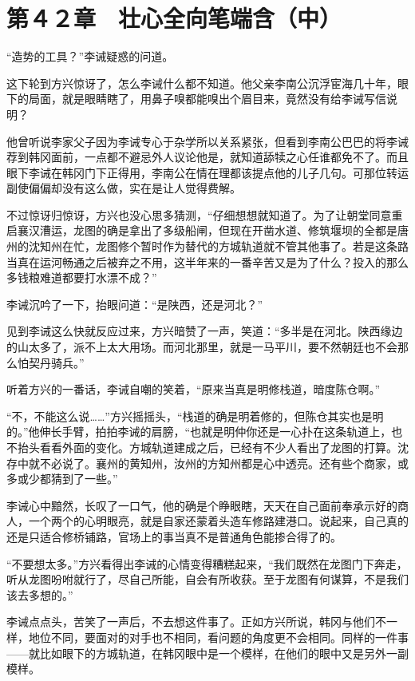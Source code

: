 \section{第４２章　壮心全向笔端含（中）}

“造势的工具？”李诫疑惑的问道。

这下轮到方兴惊讶了，怎么李诫什么都不知道。他父亲李南公沉浮宦海几十年，眼下的局面，就是眼睛瞎了，用鼻子嗅都能嗅出个眉目来，竟然没有给李诫写信说明？

他曾听说李家父子因为李诫专心于杂学所以关系紧张，但看到李南公巴巴的将李诫荐到韩冈面前，一点都不避忌外人议论他是，就知道舔犊之心任谁都免不了。而且眼下李诫在韩冈门下正得用，李南公在情在理都该提点他的儿子几句。可那位转运副使偏偏却没有这么做，实在是让人觉得费解。

不过惊讶归惊讶，方兴也没心思多猜测，“仔细想想就知道了。为了让朝堂同意重启襄汉漕运，龙图的确是拿出了多级船闸，但现在开凿水道、修筑堰坝的全都是唐州的沈知州在忙，龙图修个暂时作为替代的方城轨道就不管其他事了。若是这条路当真在运河畅通之后被弃之不用，这半年来的一番辛苦又是为了什么？投入的那么多钱粮难道都要打水漂不成？”

李诫沉吟了一下，抬眼问道：“是陕西，还是河北？”

见到李诫这么快就反应过来，方兴暗赞了一声，笑道：“多半是在河北。陕西缘边的山太多了，派不上太大用场。而河北那里，就是一马平川，要不然朝廷也不会那么怕契丹骑兵。”

听着方兴的一番话，李诫自嘲的笑着，“原来当真是明修栈道，暗度陈仓啊。”

“不，不能这么说……”方兴摇摇头，“栈道的确是明着修的，但陈仓其实也是明的。”他伸长手臂，拍拍李诫的肩膀，“也就是明仲你还是一心扑在这条轨道上，也不抬头看看外面的变化。方城轨道建成之后，已经有不少人看出了龙图的打算。沈存中就不必说了。襄州的黄知州，汝州的方知州都是心中透亮。还有些个商家，或多或少都猜到了一些。”

李诫心中黯然，长叹了一口气，他的确是个睁眼瞎，天天在自己面前奉承示好的商人，一个两个的心明眼亮，就是自家还蒙着头造车修路建港口。说起来，自己真的还是只适合修桥铺路，官场上的事当真不是普通角色能掺合得了的。

“不要想太多。”方兴看得出李诫的心情变得糟糕起来，“我们既然在龙图门下奔走，听从龙图吩咐就行了，尽自己所能，自会有所收获。至于龙图有何谋算，不是我们该去多想的。”

李诫点点头，苦笑了一声后，不去想这件事了。正如方兴所说，韩冈与他们不一样，地位不同，要面对的对手也不相同，看问题的角度更不会相同。同样的一件事——就比如眼下的方城轨道，在韩冈眼中是一个模样，在他们的眼中又是另外一副模样。

